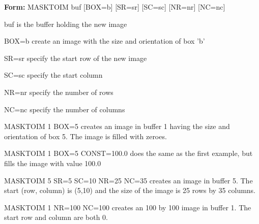 {\newpage\clearpage
{}%
\begin{command}
  \item[\textbf{Form:}  MASKTOIM buf {[BOX=b]} {[SR=sr]} {[SC=sc]} {[NR=nr]} {[NC=nc]}\hfill]{}
  \item[buf]{is the buffer holding the new image}
  \item[BOX=b]{create an image with the size and orientation of box 'b'}
  \item[SR=sr]{specify the start row of the new image}
  \item[SC=sc]{specify the start column}
  \item[NR=nr]{specify the number of rows}
  \item[NC=nc]{specify the number of columns}
\end{command}%
\lthtmlfigureZ
\lthtmlcheckvsize\clearpage}

{\newpage\clearpage
{}%
\begin{example}
  \item[MASKTOIM 1 BOX=5\hfill]{creates an image in buffer 1 having the
       size and orientation of box 5.  The image is filled with zeroes.}
\par\item[MASKTOIM 1 BOX=5 CONST=100.0\hfill]{does the same as the first
       example, but fills the image with value 100.0}
\par\item[MASKTOIM 5 SR=5 SC=10 NR=25 NC=35\hfill]{creates an image in buffer
       5.  The start (row, column) is (5,10) and the size of the image is
       25 rows by 35 columns.}
\par\item[MASKTOIM 1 NR=100 NC=100\hfill]{creates an 100 by 100 image in
       buffer 1.  The start row and column are both 0.}
\end{example}%
\lthtmlfigureZ
\lthtmlcheckvsize\clearpage}

